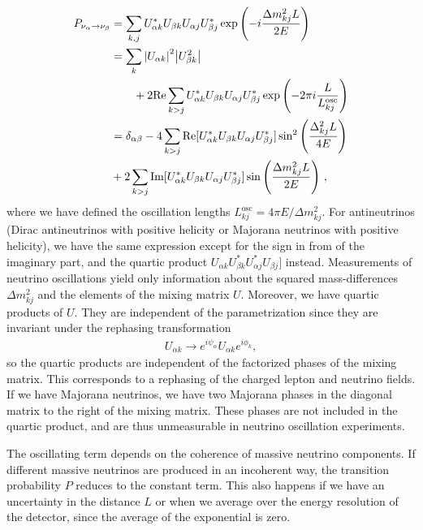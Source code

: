 \documentclass[twocolumn]{article}
\begin{document}
\begin{align*}
  P_{\nu_\alpha \to \nu_\beta} 
  &= \sum_{k,j} U^*_{\alpha k} U_{\beta k} U_{\alpha j} U^*_{\beta j} \exp\left( -i \frac{\Delta m_{kj}^2 L}{2E}\right) \\
  &= \sum_k \abs{U_{\alpha k}}^2 \abs{U_{\beta k}^2} \\
  & \qquad + 2 \text{Re}\sum_{k>j} U^*_{\alpha k} U_{\beta k} U_{\alpha j} U^*_{\beta j} \exp \left( -2\pi i \frac{L}{L^\text{osc}_{kj}}\right) \\
  &= \delta_{\alpha \beta} - 4\sum_{k > j} \text{Re}[U^*_{\alpha k} U_{\beta k} U_{\alpha j} U^*_{\beta j}] \sin^2\left(\frac{\Delta_{kj}^2L}{4E}\right) \\
  &+ 2\sum_{k>j} \text{Im}[U^*_{\alpha k}U_{\beta k}U_{\alpha j} U^*_{\beta j}]\sin\left( \frac{\Delta m_{kj}^2 L}{2E} \right)
\,,\end{align*}
where we have defined the oscillation lengths $L^\text{osc}_{kj} = 4\pi E / \Delta m_{kj}^2$. For antineutrinos (Dirac antineutrinos with positive helicity or Majorana neutrinos with positive helicity), we have the same expression except for the sign in from of the imaginary part, and the quartic product $U_{\alpha k}U^*_{\beta k}U^*_{\alpha j} U_{\beta j}]$ instead.
Measurements of neutrino oscillations yield only information about the squared mass-differences $\Delta m_{kj}^2$ and the elements of the mixing matrix $U$. Moreover, we have quartic products of $U$. They are independent of the parametrization since they are invariant under the rephasing transformation 
\begin{align*}
  U_{\alpha k} \to e^{i \psi_\alpha} U_{\alpha k} e^{i\phi_k}
,\end{align*}
so the quartic products are independent of the factorized phases of the mixing matrix. This corresponds to a rephasing of the charged lepton and neutrino fields. If we have Majorana neutrinos, we have two Majorana phases in the diagonal matrix to the right of the mixing matrix. These phases are not included in the quartic product, and are thus unmeasurable in neutrino oscillation experiments. 

The oscillating term depends on the coherence of massive neutrino components. If different massive neutrinos are produced in an incoherent way, the transition probability $P$ reduces to the constant term. This also happens if we have an uncertainty in the distance $L$ or when we average over the energy resolution of the detector, since the average of the exponential is zero.
\end{document}
